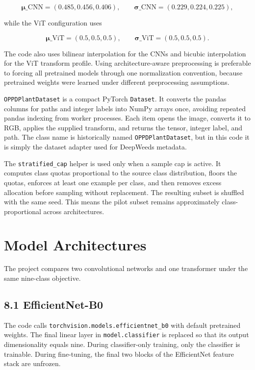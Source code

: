 \documentclass[11pt,a4paper]{article}
\begin{document}
\begin{equation}
\boldsymbol{\mu}\_{\mathrm{CNN}}=(0.485,0.456,0.406),\qquad
\boldsymbol{\sigma}\_{\mathrm{CNN}}=(0.229,0.224,0.225),
\end{equation}

while the ViT configuration uses

\begin{equation}
\boldsymbol{\mu}\_{\mathrm{ViT}}=(0.5,0.5,0.5),\qquad
\boldsymbol{\sigma}\_{\mathrm{ViT}}=(0.5,0.5,0.5).
\end{equation}

The code also uses bilinear interpolation for the CNNs and bicubic interpolation for the ViT transform profile. Using architecture-aware preprocessing is preferable to forcing all pretrained models through one normalization convention, because pretrained weights were learned under different preprocessing assumptions.

\texttt{OPPDPlantDataset} is a compact PyTorch \texttt{Dataset}. It converts the pandas columns for paths and integer labels into NumPy arrays once, avoiding repeated pandas indexing from worker processes. Each item opens the image, converts it to RGB, applies the supplied transform, and returns the tensor, integer label, and path. The class name is historically named \texttt{OPPDPlantDataset}, but in this code it is simply the dataset adapter used for DeepWeeds metadata.

The \texttt{stratified\_cap} helper is used only when a sample cap is active. It computes class quotas proportional to the source class distribution, floors the quotas, enforces at least one example per class, and then removes excess allocation before sampling without replacement. The resulting subset is shuffled with the same seed. This means the pilot subset remains approximately class-proportional across architectures.

\section{Model Architectures}
The project compares two convolutional networks and one transformer under the same nine-class objective.

\subsection{8.1 EfficientNet-B0}
The code calls \texttt{torchvision.models.efficientnet\_b0} with default pretrained weights. The final linear layer in \texttt{model.classifier} is replaced so that its output dimensionality equals nine. During classifier-only training, only the classifier is trainable. During fine-tuning, the final two blocks of the EfficientNet feature stack are unfrozen.
\end{document}

